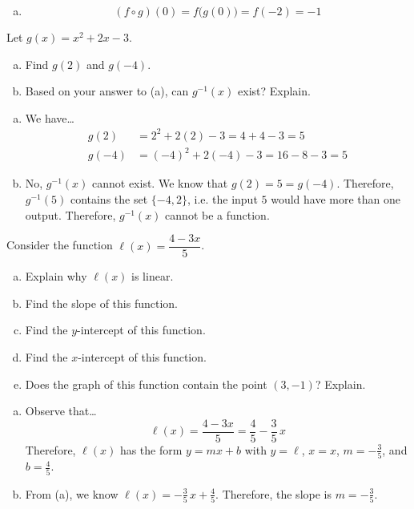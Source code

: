 \documentclass[12pt,letterpaper]{exam}
\begin{document}
\begin{questions}
\begin{enumerate}[(a)]
\item 
	\[
	(f \circ g)(0)= f \big( g(0) \big)= f(-2)= -1
	\]  
\end{enumerate}



\newpage
\question[10] Let $g(x)= x^2 + 2x - 3$. 
	\begin{enumerate}[(a)]
	\item Find $g(2)$ and $g(-4)$.
	\item Based on your answer to (a), can $g^{-1}(x)$ exist? Explain. 
	\end{enumerate} \pspace

\sol 
\begin{enumerate}[(a)]
\item We have\dots
	\[
	\begin{aligned}
	g(2)&= 2^2 + 2(2) - 3= 4 + 4 - 3= 5 \\
	g(-4)&= (-4)^2 + 2(-4) - 3= 16 - 8 - 3= 5
	\end{aligned}
	\] \pspace

\item No, $g^{-1}(x)$ cannot exist. We know that $g(2)= 5= g(-4)$. Therefore, $g^{-1}(5)$ contains the set $\{ -4, 2 \}$, i.e. the input $5$ would have more than one output. Therefore, $g^{-1}(x)$ cannot be a function. 
\end{enumerate}



\newpage
\question[10] Consider the function $\ell(x)= \dfrac{4 - 3x}{5}$. 
	\begin{enumerate}[(a)]
	\item Explain why $\ell(x)$ is linear. 
	\item Find the slope of this function.
	\item Find the $y$-intercept of this function.
	\item Find the $x$-intercept of this function.
	\item Does the graph of this function contain the point $(3, -1)$? Explain. 
	\end{enumerate} \pspace

\sol 
\begin{enumerate}[(a)]
\item Observe that\dots
	\[
	\ell(x)= \dfrac{4 - 3x}{5}= \dfrac{4}{5} - \dfrac{3}{5} \, x
	\]
Therefore, $\ell(x)$ has the form $y= mx + b$ with $y= \ell$, $x= x$, $m= -\frac{3}{5}$, and $b= \frac{4}{5}$. \pspace

\item From (a), we know $\ell(x)= -\frac{3}{5}\,x + \frac{4}{5}$. Therefore, the slope is $m= -\frac{3}{5}$. \pspace


\end{enumerate}
\end{questions}
\end{document}
